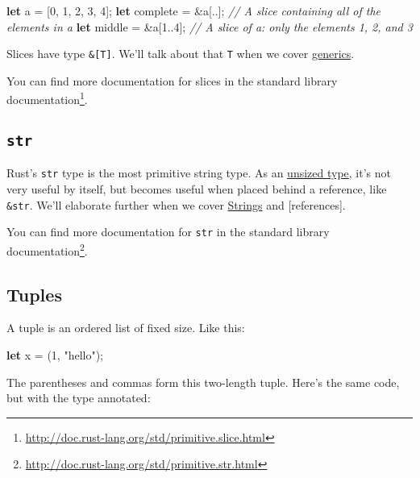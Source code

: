 \documentclass[a4paper,]{book}
\newenvironment{Shaded}{\begin{snugshade}}{\end{snugshade}}
\newcommand{\KeywordTok}[1]{\textcolor[rgb]{0.13,0.29,0.53}{\textbf{{#1}}}}
\newcommand{\DecValTok}[1]{\textcolor[rgb]{0.00,0.00,0.81}{{#1}}}
\newcommand{\StringTok}[1]{\textcolor[rgb]{0.31,0.60,0.02}{{#1}}}
\newcommand{\CommentTok}[1]{\textcolor[rgb]{0.56,0.35,0.01}{\textit{{#1}}}}
\newcommand{\NormalTok}[1]{{#1}}
\renewcommand{\href}[2]{#2\footnote{\url{#1}}}
\begin{document}
\begin{Shaded}
\begin{Highlighting}[]
\KeywordTok{let} \NormalTok{a = [}\DecValTok{0}\NormalTok{, }\DecValTok{1}\NormalTok{, }\DecValTok{2}\NormalTok{, }\DecValTok{3}\NormalTok{, }\DecValTok{4}\NormalTok{];}
\KeywordTok{let} \NormalTok{complete = &a[..]; }\CommentTok{// A slice containing all of the elements in a}
\KeywordTok{let} \NormalTok{middle = &a[}\DecValTok{1.}\NormalTok{.}\DecValTok{4}\NormalTok{]; }\CommentTok{// A slice of a: only the elements 1, 2, and 3}
\end{Highlighting}
\end{Shaded}

Slices have type \texttt{\&{[}T{]}}. We'll talk about that \texttt{T}
when we cover \protect\hyperlink{sec--generics}{generics}.

You can find more documentation for slices
\href{http://doc.rust-lang.org/std/primitive.slice.html}{in the standard
library documentation}.

\subsection{\texorpdfstring{\texttt{str}}{str}}\label{str}

Rust's \texttt{str} type is the most primitive string type. As an
\protect\hyperlink{sec--unsized-types}{unsized type}, it's not very
useful by itself, but becomes useful when placed behind a reference,
like \texttt{\&str}. We'll elaborate further when we cover
\protect\hyperlink{sec--strings}{Strings} and {[}references{]}.

You can find more documentation for \texttt{str}
\href{http://doc.rust-lang.org/std/primitive.str.html}{in the standard
library documentation}.

\hypertarget{tuples}{\subsection{Tuples}\label{tuples}}

A tuple is an ordered list of fixed size. Like this:

\begin{Shaded}
\begin{Highlighting}[]
\KeywordTok{let} \NormalTok{x = (}\DecValTok{1}\NormalTok{, }\StringTok{"hello"}\NormalTok{);}
\end{Highlighting}
\end{Shaded}

The parentheses and commas form this two-length tuple. Here's the same
code, but with the type annotated:
\end{document}
